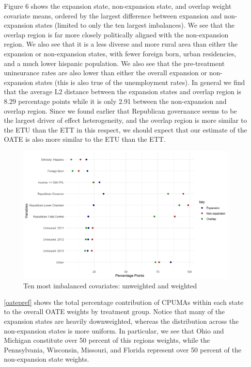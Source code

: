 \documentclass[12pt]{article}
\begin{document}
Figure 6 shows the expansion state, non-expansion state, and overlap weight covariate means, ordered by the largest difference between expansion and non-expansion states (limited to only the ten largest imbalances). We see that the overlap region is far more closely politically aligned with the non-expansion region. We also see that it is a less diverse and more rural area than either the expansion or non-expansion states, with fewer foreign born, urban residencies, and a much lower hispanic population. We also see that the pre-treatment uninsurance rates are also lower than either the overall expansion or non-expansion states (this is also true of the unemployment rates). In general we find that the average L2 distance between the expansion states and overlap region is 8.29 percentage points while it is only 2.91 between the non-expansion and overlap region. Since we found earlier that Republican governance seems to be the largest driver of effect heterogeneity, and the overlap region is more similar to the ETU than the ETT in this respect, we should expect that our estimate of the OATE is also more similar to the ETU than the ETT.

\begin{figure}
\begin{center}
    \includegraphics[scale=0.6]{images/oate-balance-plot-largest10-unweighted.jpeg}
    \caption{Ten most imbalanced covariates: unweighted and weighted}
\end{center}
\end{figure}

\ref{oatepref} shows the total percentage contribution of CPUMAs within each state to the overall OATE weights by treatment group. Notice that many of the expansion states are heavily downweighted, whereas the distribution across the non-expansion states is more uniform. In particular, we see that Ohio and Michigan constitute over 50 percent of this regions weights, while the Pennsylvania, Wisconsin, Missouri, and Florida represent over 50 percent of the non-expansion state weights.
\end{document}
